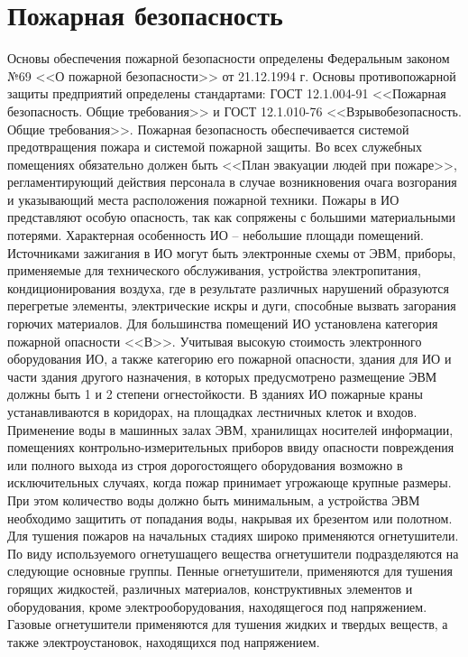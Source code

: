 \documentclass[utf8,usehyperref,12pt]{G7-32}
\begin{document}
\section{Пожарная безопасность}
Основы обеспечения пожарной безопасности определены Федеральным законом №69 <<О пожарной безопасности>> от 21.12.1994 г\cite{fl_fire_safe}. Основы противопожарной защиты предприятий определены стандартами: ГОСТ 12.1.004-91 <<Пожарная безопасность. Общие требования>>\cite{gost_12.1.004-91} и ГОСТ 12.1.010-76 <<Взрывобезопасность. Общие требования>>\cite{gost_12.1.010-76}.
Пожарная безопасность обеспечивается системой предотвращения пожара и системой пожарной защиты. Во всех служебных помещениях обязательно должен быть <<План эвакуации людей при пожаре>>, регламентирующий действия персонала в случае возникновения очага возгорания и указывающий места расположения пожарной техники. 
Пожары в ИО представляют особую опасность, так как сопряжены с большими материальными потерями. Характерная особенность ИО – небольшие площади помещений. 
Источниками зажигания в ИО могут быть электронные схемы от ЭВМ, приборы, применяемые для технического обслуживания, устройства электропитания, кондиционирования воздуха, где в результате различных нарушений образуются перегретые элементы, электрические искры и дуги, способные вызвать загорания горючих материалов. 
Для большинства помещений ИО установлена категория пожарной опасности <<В>>. 
Учитывая высокую стоимость электронного оборудования ИО, а также категорию его пожарной опасности, здания для ИО и части здания другого назначения, в которых предусмотрено размещение ЭВМ должны быть 1 и 2 степени огнестойкости. 
В зданиях ИО пожарные краны устанавливаются в коридорах, на площадках лестничных клеток и входов. Применение воды в машинных залах ЭВМ, хранилищах носителей информации, помещениях контрольно-измерительных приборов ввиду опасности повреждения или полного выхода из строя дорогостоящего оборудования возможно в исключительных случаях, когда пожар принимает угрожающе крупные размеры. При этом количество воды должно быть минимальным, а устройства ЭВМ необходимо защитить от попадания воды, накрывая их брезентом или полотном. 
Для тушения пожаров на начальных стадиях широко применяются огнетушители. По виду используемого огнетушащего вещества огнетушители подразделяются 
на следующие основные группы. 
Пенные огнетушители, применяются для тушения горящих жидкостей, различных материалов, конструктивных элементов и оборудования, кроме электрооборудования, находящегося под напряжением.
Газовые огнетушители применяются для тушения жидких и твердых веществ, а также электроустановок, находящихся под напряжением. 
\end{document}
